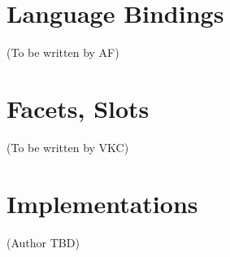 \chapter{Language Bindings}
(To be written by AF)

\appendix

\chapter{Facets, Slots}
(To be written by VKC)

\chapter{Implementations}
(Author TBD)




\printindex


